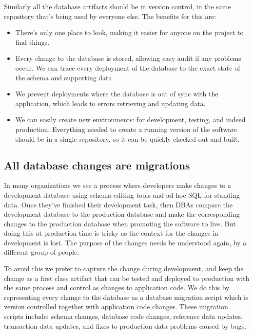 \documentclass[12pt]{article}
\begin{document}
Similarly all the database artifacts should be in version control, in
the same repository that's being used by everyone else. The benefits for
this are:

\begin{itemize}
  \item There's only one place to look, making it easier for anyone on the project to find things.
  \item Every change to the database is stored, allowing easy audit if
    any problems occur. We can trace every deployment of the database to
    the exact state of the schema and supporting data.
  \item We prevent deployments where the database is out of sync with
    the application, which leads to errors retrieving and updating data.
  \item We can easily create new environments: for development, testing, and indeed production. Everything needed to create a running version of the software should be in a single repository, so it can be quickly checked out and built.
\end{itemize}

\subsection{All database changes are migrations}

In many organizations we see a process where developers make changes to
a development database using schema editing tools and ad-hoc SQL for
standing data. Once they've finished their development task, then DBAs
compare the development database to the production database and make the
corresponding changes to the production database when promoting the
software to live. But doing this at production time is tricky as the
context for the changes in development is lost. The purpose of the
changes needs be understood again, by a different group of people.

To avoid this we prefer to capture the change during development, and
keep the change as a first class artifact that can be tested and
deployed to production with the same process and control as changes to
application code. We do this by representing every change to the
database as a database migration script which is version controlled
together with application code changes. These migration scripts include:
schema changes, database code changes, reference data updates,
transaction data updates, and fixes to production data problems caused
by bugs.
\end{document}
